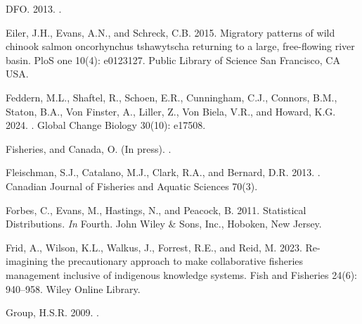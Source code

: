 \documentclass[11pt]{book}
\begin{document}
\begin{CSLReferences}{1}{0}
%
DFO. 2013. .

%
Eiler, J.H., Evans, A.N., and Schreck, C.B. 2015. Migratory patterns of wild chinook salmon oncorhynchus tshawytscha returning to a large, free-flowing river basin. PloS one 10(4): e0123127. Public Library of Science San Francisco, CA USA.

%
Feddern, M.L., Shaftel, R., Schoen, E.R., Cunningham, C.J., Connors, B.M., Staton, B.A., Von Finster, A., Liller, Z., Von Biela, V.R., and Howard, K.G. 2024. . Global Change Biology 30(10): e17508.

%
Fisheries, and Canada, O. (In press). .

%
Fleischman, S.J., Catalano, M.J., Clark, R.A., and Bernard, D.R. 2013. . Canadian Journal of Fisheries and Aquatic Sciences 70(3).

%
Forbes, C., Evans, M., Hastings, N., and Peacock, B. 2011. Statistical {Distributions}. \emph{In} Fourth. {John Wiley \& Sons, Inc.}, {Hoboken, New Jersey}.

%
Frid, A., Wilson, K.L., Walkus, J., Forrest, R.E., and Reid, M. 2023. Re-imagining the precautionary approach to make collaborative fisheries management inclusive of indigenous knowledge systems. Fish and Fisheries 24(6): 940--958. Wiley Online Library.

%
Group, H.S.R. 2009. .


\end{CSLReferences}
\end{document}
